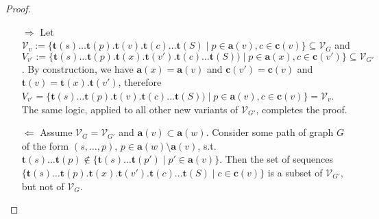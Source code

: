 \documentclass[a4paper]{article}
\newtheorem{conjecture}{Conjecture}
\newcommand{\prefix}{\mathbf{p}}
\newcommand{\parent}{\mathbf{a}}
\newcommand{\child}{\mathbf{c}}
\newcommand{\seq}{\mathbf{t}}
\begin{document}
\begin{proof}
    \begin{enumerate}
        \item[$\Rightarrow$] Let $\mathcal V_v := 
            \{\seq(s)\ldots\seq(p).\seq(v).\seq(c)\ldots\seq(S) \mid p \in
            \parent(v), c \in \child(v) \} \subseteq \mathcal V_{G}$ and 
            $V_{v'} :=
            \{\seq(s)\ldots\seq(p).\seq(x).\seq(v').\seq(c)\ldots\seq(S)) \mid
            p \in \parent(x), c \in \child(v') \}\subseteq \mathcal V_{G'}$.
            By construction, we have $\parent(x) = \parent(v)$ and $\child(v')
            = \child(v)$ and $\seq(v) = \seq(x).\seq(v')$, therefore $V_{v'} =
            \{\seq(s)\ldots\seq(p).\seq(v).\seq(c)\ldots\seq(S)) \mid p \in
            \parent(v), c \in \child(v) \} = \mathcal V_v$. The same logic,
            applied to all other new variants of $\mathcal V_{G'}$, completes
            the proof. 

    \item[$\Leftarrow$] Assume $\mathcal V_G = \mathcal V_{G'}$ and $\parent(v)
        \subset \parent(w)$. Consider some path of graph $G$ of the form $(s,
        \ldots, p)$, $p \in \parent(w) \setminus \parent(v)$, s.t.
        $\seq(s)\ldots\seq(p) \not\in \{\seq(s)\ldots\seq(p') \mid p' \in
        \parent(v)\}$. Then the set of sequences
        $\{\seq(s)\ldots\seq(p).\seq(x).\seq(v').\seq(c)\ldots\seq(S) \mid c
        \in \child(v)\}$ is a subset of $\mathcal V_{G'}$, but not of $\mathcal
        V_{G}$. 
    \end{enumerate}
\end{proof}

\end{document}
